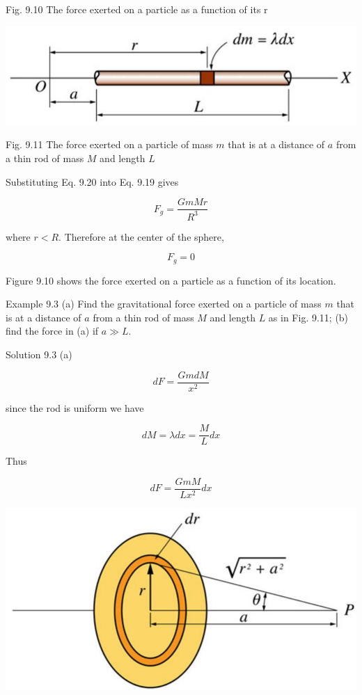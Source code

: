 \documentclass[10pt]{article}
\begin{document}
Fig. 9.10 The force exerted on a particle as a function of its r

\begin{center}
\includegraphics[max width=\textwidth]{2024_09_13_db1f357d2aad0a03eb2eg-148(1)}
\end{center}

Fig. 9.11 The force exerted on a particle of mass $m$ that is at a distance of $a$ from a thin rod of mass $M$ and length $L$

Substituting Eq. 9.20 into Eq. 9.19 gives

$$
F_{g}=\frac{G m M r}{R^{3}}
$$

where $r<R$. Therefore at the center of the sphere,

$$
F_{g}=0
$$

Figure 9.10 shows the force exerted on a particle as a function of its location.

Example 9.3 (a) Find the gravitational force exerted on a particle of mass $m$ that is at a distance of $a$ from a thin rod of mass $M$ and length $L$ as in Fig. 9.11; (b) find the force in (a) if $a \gg L$.

Solution 9.3 (a)

$$
d F=\frac{G m d M}{x^{2}}
$$

since the rod is uniform we have

$$
d M=\lambda d x=\frac{M}{L} d x
$$

Thus

$$
d F=\frac{G m M}{L x^{2}} d x
$$

\begin{center}
\includegraphics[max width=\textwidth]{2024_09_13_db1f357d2aad0a03eb2eg-149}
\end{center}
\end{document}
